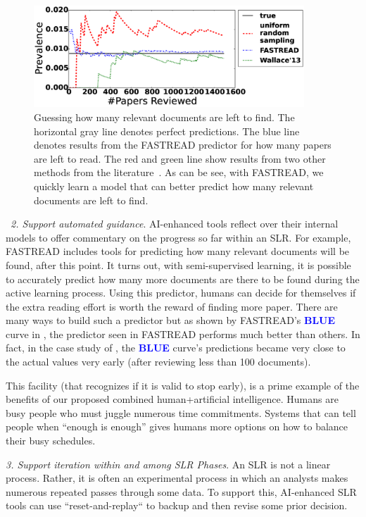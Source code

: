 \begin{figure}
\begin{center}
\includegraphics[width=4in]{figure_prev_all_Wahono.eps}
\end{center}
\caption{Guessing how many relevant documents are left to find.
The horizontal gray line denotes perfect predictions. The blue line denotes
results from the FASTREAD predictor for how many papers are left to read.
The red and green line show results from two other methods from the literature~\cite{wallace2013active}. As can be see, with FASTREAD, we quickly learn a
model that can better predict how many relevant documents are left to find.
}\label{fig:error}
\end{figure}	
~{\em 2. Support automated guidance}. AI-enhanced tools  reflect over their internal models to offer commentary on the progress so far within an SLR.
		For example,  FASTREAD includes tools for predicting how
many relevant documents will be found, after this point. It turns out, with semi-supervised learning, it is possible to accurately predict how many more documents are there to be found during the active learning process.  Using this predictor,
humans can decide for themselves if the 
extra reading effort is worth the reward
of finding more paper. 
There are many ways to build such a predictor but as shown by FASTREAD's \textcolor{blue}{{\bf BLUE}} curve in
, the predictor seen in FASTREAD performs much better than others. In fact, in the case study of , the \textcolor{blue}{{\bf BLUE}} curve's predictions became very close to the actual values very early (after reviewing less than 100 documents).

This facility (that recognizes if it is valid to stop early), is a prime example of the benefits of our proposed combined human+artificial  intelligence. Humans are busy people who must juggle numerous time commitments. Systems that can tell people when ``enough is enough'' gives humans more options on how to balance their busy schedules.

{\em 3. Support iteration within and among SLR Phases}. An SLR is not
		a linear process. Rather, it is often an experimental process in which an analysts makes numerous repeated passes through some data. To support this, AI-enhanced SLR tools can use ``reset-and-replay`` to backup and then revise some prior decision.  

